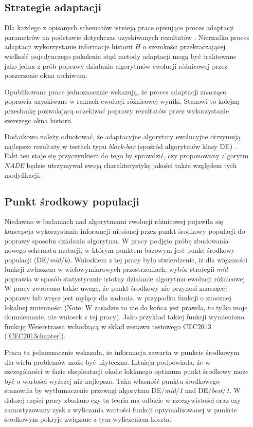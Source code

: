 \documentclass[12pt,a4paper]{report}
\begin{document}
{{{\subsection{Strategie adaptacji}
\label{Adaptation}
\par{
Dla każdego z opisanych schematów istnieją prace opisujące proces adaptacji parametrów na podstawie dotychczas uzyskiwanych rezultatów \cite{zhang2009adaptive,JADE,SHADE}. Nierzadko proces adaptacji wykorzystanie informacje historii $H$ o szerokości przekraczającej wielkość pojedynczego pokolenia stąd metody adaptacji mogą być traktowane jako jedna z prób poprawy działania algorytmów ewolucji różnicowej przez poszerzenie okna archiwum.
}
\par{
Opublikowane prace jednoznacznie wskazują, że proces adaptacji znacząco poprawia uzyskiwane w ramach ewolucji różnicowej wyniki. Stanowi to kolejną przesłankę pozwalającą oczekiwać poprawy rezultatów przez wykorzystanie szerszego okna historii.
}
\par{
Dodatkowo należy odnotować, że adaptacyjne algorytmy ewolucyjne otrzymują najlepsze rezultaty w testach typu \emph{black-box} (spośród algorytmów klasy DE) \cite{CEC2013Comp}. Fakt ten staje się przyczynkiem do tego by sprawdzić, czy proponowany algorytm \emph{NADE} będzie utrzymywał swoją charakterystykę jakości także względem tych modyfikacji.
}

\subsection{Punkt środkowy populacji}
\label{MidPoint}
\par{
Niedawno w badaniach nad algorytmami ewolucji różnicowej \cite{DEmid} pojawiła się koncepcja wykorzystania inforamcji niesionej przez punkt środkowy populacji do poprawy sposobu działania algorytmu. W pracy \cite{DEmid} podjęto próbę zbudowania nowego schematu mutacji, w którym punktem bazowym jest punkt środkowy populacji (DE/\emph{mid}/\emph{k}). Wnioskiem z tej pracy było stwierdzenie, iż dla większości funkcji zwłaszcza w wielowymiarowych przestrzeniach, wybór strategii \emph{mid} poprawia w sposób statystycznie istotny działanie algorytmu ewolucji różnicowej. W pracy zwrócono także uwagę, że punkt środkowy nie przynosi znaczącej poprawy lub wręcz jest mylący dla zadania, w przypadku funkcji o znacznej lokalnej zmienności (Note: W zasadzie to nie do końca jest prawda, to tylko moje domniemanie, nie wniosek z tej pracy). Jako przykład takiej funkcji wymieniono funkcję Weierstrassa wchodzącą w skład zestawu testowego CEC2013 (\ref{CEC2013chapter}).
}
\par{
Praca ta jednoznacznie wskazała, że informacja zawarta w punkcie środkowym dla wielu problemów może być użyteczna. Intuicja podpowiada, że w szczególności w fazie eksploatacji okolic loklanego optimum punkt środkowy może być o wartości wyższej niż najlepsza. Taka własność punktu środkowego stanowiła by wytłumaczenie przewagi algorytmu DE/\emph{mid}/\emph{1} nad DE/\emph{best}/\emph{1}. W dalszej części pracy zbadano czy ta teoria ma odbicie w rzeczywistości oraz czy zamortyzowany zysk z wyliczania wartości funkcji optymalizowanej w punkcie środkowym pokryje związane z tym wyliczeniem koszta.
}
}}}
\end{document}
